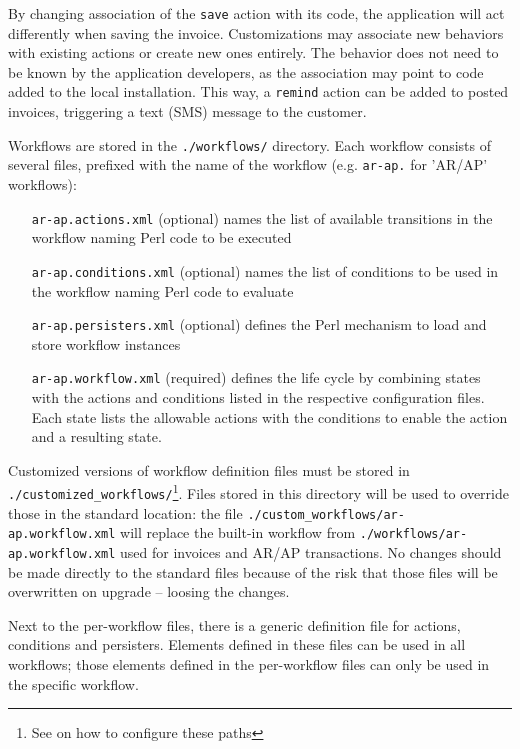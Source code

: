 By changing association of the \texttt{save} action with its code, the application will act
differently when saving the invoice.  Customizations may associate new behaviors with existing
actions or create new ones entirely.  The behavior does not need to be known by the application
developers, as the association may point to code added to the local installation.  This way, a
\texttt{remind} action can be added to posted invoices, triggering a text (SMS) message to the
customer.


Workflows are stored in the \texttt{./workflows/} directory.  Each workflow consists of
several files, prefixed with the name of the workflow (e.g. \texttt{ar-ap.} for 'AR/AP' workflows):

\begin{enumerate}
	\item [\texttt{ar-ap.actions.xml}] (optional) names the list of available transitions
	in the workflow naming Perl code to be executed
	\item [\texttt{ar-ap.conditions.xml}] (optional) names the list of conditions to be used
	in the workflow naming Perl code to evaluate
	\item [\texttt{ar-ap.persisters.xml}] (optional) defines the Perl mechanism to load and store
	workflow instances
	\item [\texttt{ar-ap.workflow.xml}] (required) defines the life cycle by combining states with
	the actions and conditions listed in the respective configuration files. Each state lists
	the allowable actions with the conditions to enable the action and a resulting state.
\end{enumerate}

Customized versions of workflow definition files must be stored in
 \texttt{./customized\_workflows/}\footnote{See
 	 on how to configure
 these paths}.  Files stored in this directory will be used to override those in
the standard location: the file \texttt{./custom\_workflows/ar-ap.workflow.xml} will replace the built-in workflow
from \texttt{./workflows/ar-ap.workflow.xml} used for invoices and AR/AP transactions.
No changes should be made directly to the standard files because of the risk that those
files will be overwritten on upgrade -- loosing the changes.

Next to the per-workflow files, there is a generic definition file for actions,
conditions and persisters.  Elements defined in these files can be used in all
workflows; those elements defined in the per-workflow files can only be used
in the specific workflow.

